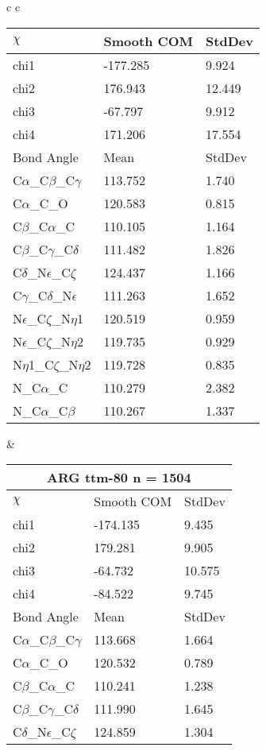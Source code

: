 \begin{longtable}{ c c }
\begin{tabular}{ l l l }
  $\chi$       & Smooth COM & StdDev \\ \midrule
  chi1 & -177.285 & 9.924 \\ 
  chi2 & 176.943 & 12.449 \\ 
  chi3 & -67.797 & 9.912 \\ 
  chi4 & 171.206 & 17.554 \\ \midrule
  Bond Angle   & Mean     & StdDev \\ \midrule
  C$\alpha$\_C$\beta$\_C$\gamma$ & 113.752 & 1.740\\
  C$\alpha$\_C\_O & 120.583 & 0.815\\
  C$\beta$\_C$\alpha$\_C & 110.105 & 1.164\\
  C$\beta$\_C$\gamma$\_C$\delta$ & 111.482 & 1.826\\
  C$\delta$\_N$\epsilon$\_C$\zeta$ & 124.437 & 1.166\\
  C$\gamma$\_C$\delta$\_N$\epsilon$ & 111.263 & 1.652\\
  N$\epsilon$\_C$\zeta$\_N$\eta$1 & 120.519 & 0.959\\
  N$\epsilon$\_C$\zeta$\_N$\eta$2 & 119.735 & 0.929\\
  N$\eta$1\_C$\zeta$\_N$\eta$2 & 119.728 & 0.835\\
  N\_C$\alpha$\_C & 110.279 & 2.382\\
  N\_C$\alpha$\_C$\beta$ & 110.267 & 1.337\\
  \bottomrule
  \end{tabular}
  &
  \begin{tabular}{ l l l }
  \toprule
  \multicolumn{3}{c}{ARG \textbf{ttm-80} n = 1504} \\ \toprule
  $\chi$       & Smooth COM & StdDev \\ \midrule
  chi1 & -174.135 & 9.435 \\ 
  chi2 & 179.281 & 9.905 \\ 
  chi3 & -64.732 & 10.575 \\ 
  chi4 & -84.522 & 9.745 \\ \midrule
  Bond Angle   & Mean     & StdDev \\ \midrule
  C$\alpha$\_C$\beta$\_C$\gamma$ & 113.668 & 1.664\\
  C$\alpha$\_C\_O & 120.532 & 0.789\\
  C$\beta$\_C$\alpha$\_C & 110.241 & 1.238\\
  C$\beta$\_C$\gamma$\_C$\delta$ & 111.990 & 1.645\\
  C$\delta$\_N$\epsilon$\_C$\zeta$ & 124.859 & 1.304\\

\end{tabular}
\end{longtable}
